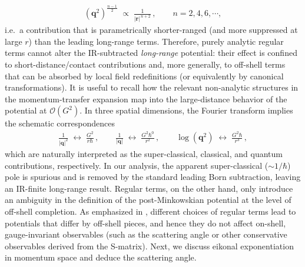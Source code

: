 {\begin{align}
(\boldsymbol{q}^2)^{\frac{n-1}{2}}
\;\propto\;\frac{1}{|\boldsymbol{r}|^{\,n+2}}\,, \qquad n=2,4,6,\cdots,
\label{eq:Vn_falloff_refreply}
\end{align}
i.e.\ a contribution that is parametrically shorter-ranged (and more suppressed at large $r$) than the leading long-range terms.
Therefore, purely analytic regular terms cannot alter the IR-subtracted \emph{long-range} potential: their effect is confined to short-distance/contact contributions and, more generally, to off-shell terms that can be absorbed by local field redefinitions (or equivalently by canonical transformations).
It is useful to recall how the relevant non-analytic structures in the momentum-transfer expansion map into the large-distance behavior of the potential at $\mathcal{O}(G^2)$.
In three spatial dimensions, the Fourier transform implies the schematic correspondences
\begin{align}
\frac{1}{|\boldsymbol{q}|^{2}}\;\longleftrightarrow\;\frac{G^2}{r\hbar}\,,\qquad
\frac{1}{|\boldsymbol{q}|}\;\longleftrightarrow\;\frac{G^2 \hbar^0}{r^{2}}\,,\qquad
\log(\boldsymbol{q}^{2})\;\longleftrightarrow\;\frac{G^2\hbar}{r^{3}}\,,
\end{align}
which are naturally interpreted as the super-classical, classical, and quantum contributions, respectively.
In our analysis, the apparent super-classical ($\sim 1/\hbar$) pole is spurious and is removed by the standard leading Born subtraction, leaving an IR-finite long-range result.
Regular terms, on the other hand, only introduce an ambiguity in the definition of the post-Minkowskian potential at the level of off-shell completion.
As emphasized in \cite{Correia:2024jgr,Correia:2024yfx}, different choices of regular terms lead to potentials that differ by off-shell pieces, and hence they do not affect on-shell, gauge-invariant observables (such as the scattering angle or other conservative observables derived from the S-matrix).  }
Next, we discuss eikonal exponentiation in momentum space and deduce the scattering angle.

